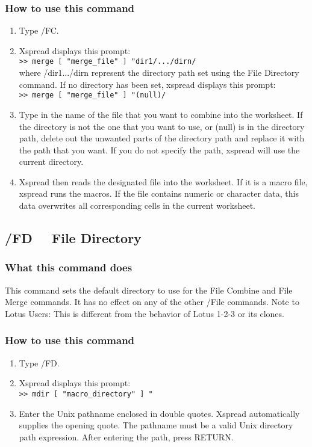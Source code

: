 \subsubsection*{How to use this command}
\begin{enumerate}
\item{Type /FC.}
\item{Xspread displays this prompt:\\
\verb|>> merge [ "merge_file" ] "dir1/.../dirn/|   \\
        where /dir1.../dirn represent the directory path set using the
        File Directory command.  If no directory has been set, xspread
        displays this prompt:   \\
\verb|>> merge [ "merge_file" ] "(null)/| }

\item{Type in the name of the file that you want to combine into the
        worksheet.  If the directory is not the one that you want to use,
        or (null) is in the directory path, delete out the unwanted parts
        of the directory path and replace it with the path that you want.
        If you do not specify the path, xspread will use the current
        directory.}
\item{Xspread then reads the designated file into the worksheet.  If it
        is a macro file, xspread runs the macros.  If the file contains
        numeric or character data, this data overwrites all corresponding
        cells in the current worksheet.}
\end{enumerate}


\subsection*{/FD \ \     File Directory}

\subsubsection*{What this command does}
This command sets the default directory to use for the File Combine 
and File Merge commands.  It has no effect on any of the other /File 
commands.  Note to Lotus Users:  This is different from the behavior 
of Lotus 1-2-3 or its clones.

\subsubsection*{How to use this command}
\begin{enumerate}
\item{Type /FD.}
\item{Xspread displays this prompt:\\
          \verb|>> mdir [ "macro_directory" ] "| } 
\item{Enter the Unix pathname enclosed in double quotes.  Xspread
        automatically supplies the opening quote.  The pathname must be a
        valid Unix directory path expression.  After entering the path,
        press RETURN.}
\end{enumerate}
        
